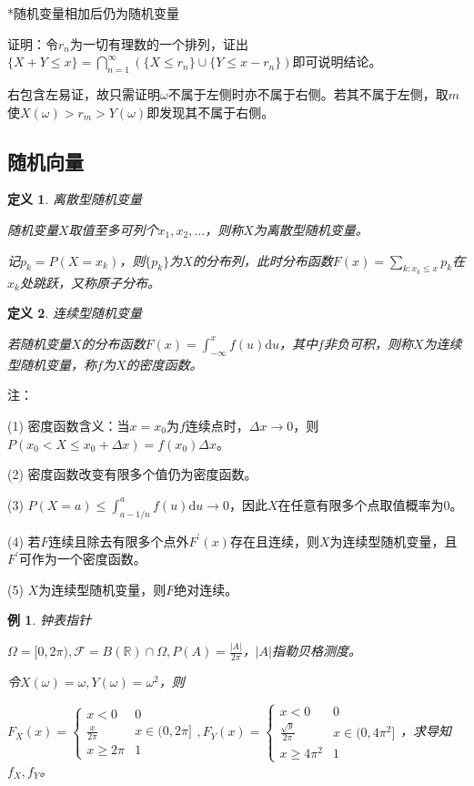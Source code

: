 \documentclass[a4paper,UTF8,fontset=windows]{ctexart}
\newtheorem{exmp}{例}[section]
\newtheorem{defi}{定义}[section]
\begin{document}
*随机变量相加后仍为随机变量

证明：令$r_n$为一切有理数的一个排列，证出$\{X+Y\le x\}=\bigcap_{n=1}^\infty(\{X\le r_n\}\cup\{Y\le x-r_n\})$即可说明结论。

右包含左易证，故只需证明$\omega$不属于左侧时亦不属于右侧。若其不属于左侧，取$m$使$X(\omega)>r_m>Y(\omega)$即发现其不属于右侧。

\subsection{随机向量}
\begin{defi} 离散型随机变量

随机变量$X$取值至多可列个$x_1,x_2,\dots$，则称$X$为离散型随机变量。

记$p_k=P(X=x_k)$，则$\{p_k\}$为$X$的分布列，此时分布函数$F(x)=\sum_{k: x_k\le x}p_k$在$x_k$处跳跃，又称\emph{原子分布}。
\end{defi}

\begin{defi} 连续型随机变量

若随机变量$X$的分布函数$F(x)=\int_{-\infty}^xf(u)\mathrm{d}u$，其中$f$非负可积，则称$X$为连续型随机变量，称$f$为$X$的\emph{密度函数}。
\end{defi}

注：

(1) 密度函数含义：当$x=x_0$为$f$连续点时，$\Delta x\to0$，则$P(x_0<X\le x_0+\Delta x)=f(x_0)\Delta x$。

(2) 密度函数改变有限多个值仍为密度函数。

(3) $P(X=a)\le\int_{a-1/n}^af(u)\mathrm{d}u\to0$，因此$X$在任意有限多个点取值概率为0。

(4) 若$F$连续且除去有限多个点外$F^\prime(x)$存在且连续，则$X$为连续型随机变量，且$F^\prime$可作为一个密度函数。

(5) $X$为连续型随机变量，则$F$绝对连续。

\begin{exmp} 钟表指针
	
$\Omega=[0,2\pi),\mathcal{F}=B(\mathbb{R})\cap\Omega,P(A)=\frac{|A|}{2\pi}$，$|A|$指勒贝格测度。

令$X(\omega)=\omega,Y(\omega)=\omega^2$，则

$F_X(x)=\begin{cases}x<0&0\\\frac{x}{2\pi}&x\in(0,2\pi]\\x\ge2\pi&1\end{cases},F_Y(x)=\begin{cases}x<0&0\\\frac{\sqrt{y}}{2\pi}&x\in(0,4\pi^2]\\x\ge4\pi^2&1\end{cases}$，求导知$f_X,f_Y$。
\end{exmp}
\end{document}

